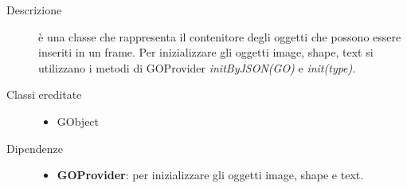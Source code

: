 \begin{description}
\item[Descrizione] \hfill
	è una classe che rappresenta il contenitore degli oggetti che possono essere inseriti in un frame. Per inizializzare gli oggetti image, shape, text si utilizzano i metodi di GOProvider \textit{initByJSON(GO)} e \textit{init(type)}. 
	
	\item[Classi ereditate] \hfill
	\begin{itemize}
		\item GObject
	\end{itemize}
	
	\item[Dipendenze] \hfill
	\begin{itemize}
		\item \textbf{GOProvider}: per inizializzare gli oggetti image, shape e text.
	\end{itemize}
	

\end{description}
